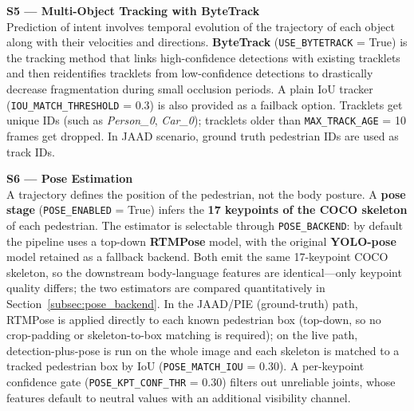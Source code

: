 \documentclass[conference]{IEEEtran}
\begin{document}
\textbf{S5 --- Multi-Object Tracking with ByteTrack} \\
Prediction of intent involves temporal evolution of the trajectory of each object along with their velocities and directions. \textbf{ByteTrack} (\texttt{USE\_BYTETRACK} = True) is the tracking method that links high-confidence detections with existing tracklets and then reidentifies tracklets from low-confidence detections to drastically decrease fragmentation during small occlusion periods. A plain IoU tracker (\texttt{IOU\_MATCH\_THRESHOLD} = 0.3) is also provided as a failback option. Tracklets get unique IDs (such as \textit{Person\_0}, \textit{Car\_0}); tracklets older than \texttt{MAX\_TRACK\_AGE} = 10 frames get dropped. In JAAD scenario, ground truth pedestrian IDs are used as track IDs.

\textbf{S6 --- Pose Estimation} \\
A trajectory defines the position of the pedestrian, not the body posture. A \textbf{pose stage} (\texttt{POSE\_ENABLED} = True) infers the \textbf{17 keypoints of the COCO skeleton} of each pedestrian. The estimator is selectable through \texttt{POSE\_BACKEND}: by default the pipeline uses a top-down \textbf{RTMPose} model, with the original \textbf{YOLO-pose} model retained as a fallback backend. Both emit the same 17-keypoint COCO skeleton, so the downstream body-language features are identical---only keypoint quality differs; the two estimators are compared quantitatively in Section~\ref{subsec:pose_backend}. In the JAAD/PIE (ground-truth) path, RTMPose is applied directly to each known pedestrian box (top-down, so no crop-padding or skeleton-to-box matching is required); on the live path, detection-plus-pose is run on the whole image and each skeleton is matched to a tracked pedestrian box by IoU (\texttt{POSE\_MATCH\_IOU} = 0.30). A per-keypoint confidence gate (\texttt{POSE\_KPT\_CONF\_THR} = 0.30) filters out unreliable joints, whose features default to neutral values with an additional visibility channel.
\end{document}

